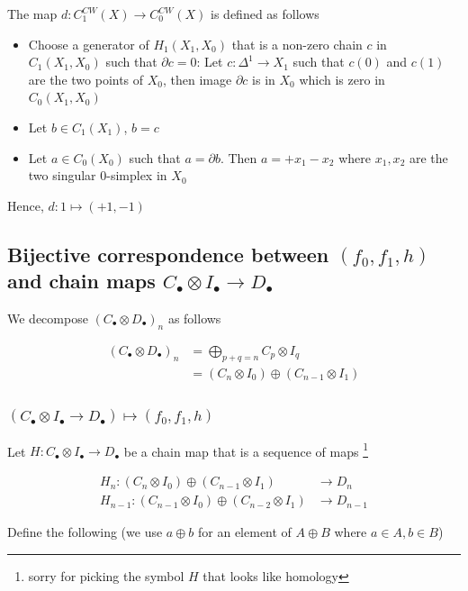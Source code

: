 \documentclass{article}
\begin{document}
The map $d: C^{CW}_1(X) \to C^{CW}_0(X)$ is defined as follows
\begin{itemize}
    \item Choose a generator of $H_1(X_1, X_0)$ that is a non-zero chain $c$ in $C_1(X_1, X_0)$ such that $\partial c = 0$: Let $c: \Delta^1 \to X_1$ such that $c(0)$ and $c(1)$ are the two points of $X_0$, then image $\partial c$ is in $X_0$ which is zero in $C_0(X_1, X_0)$

    \item Let $b \in C_1(X_1)$, $b=c$

    \item Let $a \in C_0(X_0)$ such that $a = \partial b$. Then $a = +x_1 - x_2$ where $x_1, x_2$ are the two singular $0$-simplex in $X_0$
\end{itemize}

Hence, $d: 1 \mapsto (+1, -1)$

\subsection{Bijective correspondence between $(f_0, f_1, h)$ and chain maps $C_\bullet \otimes I_\bullet \to D_\bullet$}

We decompose $(C_\bullet \otimes D_\bullet)_n$ as follows

\begin{align*}
    (C_\bullet \otimes D_\bullet)_n
    &= \bigoplus_{p + q = n} C_p \otimes I_q \\
    &= (C_n \otimes I_0) \oplus (C_{n-1} \otimes I_1)
\end{align*}

\subsubsection{$(C_\bullet \otimes I_\bullet \to D_\bullet) \mapsto (f_0, f_1, h)$}

Let $H: C_\bullet \otimes I_\bullet \to D_\bullet$ be a chain map that is a sequence of maps \footnote{sorry for picking the symbol $H$ that looks like homology}

\begin{align*}
    H_n: (C_n \otimes I_0) \oplus (C_{n-1} \otimes I_1) &\to D_n \\
    H_{n-1}: (C_{n-1} \otimes I_0) \oplus (C_{n-2} \otimes I_1) &\to D_{n-1}
\end{align*}

Define the following (we use $a \oplus b$ for an element of $A \oplus B$ where $a \in A, b \in B$)
\end{document}
